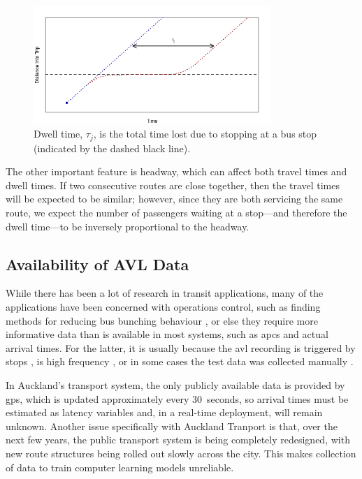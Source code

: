 \documentclass[12pt,a4paper]{article}
\begin{document}
\begin{figure}[bt]
  \centering
  \includegraphics[width=0.8\textwidth]{dwell_time.png}
  \caption{Dwell time, $\tau_j$, is the total time lost due to stopping at a bus stop (indicated by the dashed black line).}
  \label{fig:dwell-time}
\end{figure}

The other important feature is headway, which can affect both travel times and dwell times.
If two consecutive routes are close together, 
then the travel times will be expected to be similar;
however, since they are both servicing the same route, 
we expect the number of passengers waiting at a stop---and therefore
the dwell time---to be inversely proportional to the headway.





\subsection{Availability of AVL Data}
\label{sec:data-types}

While there has been a lot of research in transit applications,
many of the applications have been concerned with operations control,
such as finding methods for reducing bus bunching behaviour \citep{hans-etal:2015},
or else they require more informative data than is available in most systems,
such as \glspl{apc} and actual arrival times.
For the latter, it is usually because the \gls{avl} recording is triggered by stops
\citep{hans-etal:2015},
is high frequency \citep{chang-etal:2010},
or in some cases the test data was collected manually
\citep{yu-etal:2010}.


In Auckland's transport system, the only publicly available data is provided
by \gls{gps}, which is updated approximately every 30~seconds,
so arrival times must be estimated as latency variables and, 
in a real-time deployment, will remain unknown.
Another issue specifically with Auckland Tranport is that,
over the next few years, 
the public transport system is being completely redesigned,
with new route structures being rolled out slowly across the city.
This makes collection of data to train computer learning models unreliable.
\end{document}

